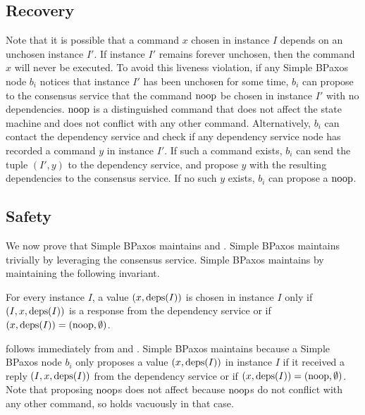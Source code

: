 \subsection{Recovery}
Note that it is possible that a command $x$ chosen in instance $I$ depends on
an unchosen instance $I'$. If instance $I'$ remains forever unchosen, then the
command $x$ will never be executed. To avoid this liveness violation, if any
Simple BPaxos node $b_i$ notices that instance $I'$ has been unchosen for some
time, $b_i$ can propose to the consensus service that the command $\text{noop}$ be
chosen in instance $I'$ with no dependencies. $\text{noop}$ is a distinguished
command that does not affect the state machine and does not conflict with any
other command.
%
Alternatively, $b_i$ can contact the dependency service and check if any
dependency service node has recorded a command $y$ in instance $I'$. If such a
command exists, $b_i$ can send the tuple $(I', y)$ to the dependency service,
and propose $y$ with the resulting dependencies to the consensus service. If no
such $y$ exists, $b_i$ can propose a $\text{noop}$.

\subsection{Safety}
We now prove that Simple BPaxos maintains  and
.
%
Simple BPaxos maintains  trivially by leveraging the
consensus service. Simple BPaxos maintains  by
maintaining the following invariant.

\begin{invariant}
  For every instance $I$, a value $(x, \text{deps}(I))$ is chosen in instance $I$
  only if $(I, x, \text{deps}(I))$ is a response from the dependency service or if
  $(x, \text{deps}(I)) = (\text{noop}, \emptyset)$.
\end{invariant}

 follows immediately from 
and .  Simple BPaxos maintains
 because a Simple BPaxos node $b_i$ only proposes
a value $(x, \text{deps}(I))$ in instance $I$ if it received a reply $(I, x,
\text{deps}(I))$ from the dependency service or if $(x, \text{deps}(I)) = (\text{noop},
\emptyset)$. Note that proposing $\text{noop}{}$s does not affect
 because $\text{noop}$s do not conflict with any other
command, so  holds vacuously in that case.

